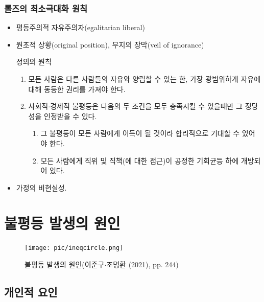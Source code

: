 \documentclass[aspectratio=169,xcolor=dvipsnames,handout]{beamer}
\begin{document}
\begin{frame}[<+->]
\frametitle{롤즈의 최소극대화 원칙}
    \begin{itemize}
        \item 평등주의적 자유주의자(egalitarian liberal)
        \item 원초적 상황(original position), 무지의 장막(veil of ignorance)
        \begin{block}{정의의 원칙}
            \begin{enumerate}
                \item 모든 사람은 다른 사람들의 자유와 양립할 수 있는 한, 가장 광범위하게 자유에 대해 동등한 권리를 가져야 한다.
                \item 사회적$\cdot$경제적 불평등은 다음의 두 조건을 모두 충족시킬 수 있을때만 그 정당성을 인정받을 수 있다.
                    \begin{enumerate}
                        \item 그 불평등이 모든 사람에게 이득이 될 것이라 합리적으로 기대할 수 있어야 한다.
                        \item 모든 사람에게 직위 및 직책(에 대한 접근)이 공정한 기회균등 하에 개방되어 있다.
                \end{enumerate}
            \end{enumerate}
        \end{block}
        \item 가정의 비현실성.        
    \end{itemize}
\end{frame}

\section{불평등 발생의 원인}

\begin{frame}[<+->]
    \begin{figure}
        \centering
        \texttt{[image: pic/ineqcircle.png]}
        \caption{불평등 발생의 원인(이준구$\cdot$조명환 (2021), pp. 244)}
    \end{figure}
\end{frame}

\subsection{개인적 요인}
\end{document}
